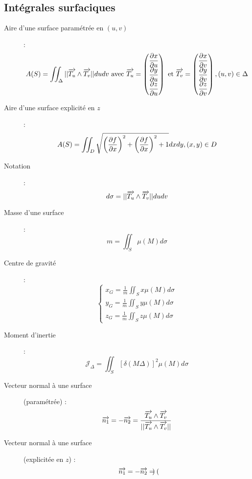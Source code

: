 \subsection{Intégrales surfaciques}
\begin{description}
\item[Aire d'une surface paramétrée en $(u,v)$] :
    \[
        A(S)=
        \iint_\Delta ||\overrightarrow{T_u}\land\overrightarrow{T_v}||dudv
        \textrm{ avec }
        \overrightarrow{T_u}=
        \begin{pmatrix}
            \dfrac{\partial x}{\partial u}\\
            \dfrac{\partial y}{\partial u}\\
            \dfrac{\partial z}{\partial u}
        \end{pmatrix}
        \textrm{ et }
        \overrightarrow{T_v}=
        \begin{pmatrix}
            \dfrac{\partial x}{\partial v}\\
            \dfrac{\partial y}{\partial v}\\
            \dfrac{\partial z}{\partial v}
        \end{pmatrix},
        (u,v)\in\Delta
    \]
\item[Aire d'une surface explicité en $z$] :
    \[
        A(S)=\iint_D\sqrt{
            \left(\dfrac{\partial f}{\partial x}\right)^2
            +\left(\dfrac{\partial f}{\partial x}\right)^2
            +1
        }dxdy, (x,y)\in D
    \]
\item[Notation] :
    \[
        d\sigma=||\overrightarrow{T_u}\land\overrightarrow{T_v}||dudv
    \]
\item[Masse d'une surface] :
    \[
        m=\iint_S\mu(M)d\sigma
    \]
\item[Centre de gravité] :
    \[
        \begin{cases}
            x_G=\frac{1}{m}\iint_Sx\mu(M)d\sigma\\
            y_G=\frac{1}{m}\iint_Sy\mu(M)d\sigma\\
            z_G=\frac{1}{m}\iint_Sz\mu(M)d\sigma
        \end{cases}
    \]
\item[Moment d'inertie] :
    \[
        \mathcal J_\Delta=\iint_S[\delta(M\Delta)]^2\mu(M)d\sigma
    \]
\item[Vecteur normal à une surface] (paramétrée) :
    \[
        \overrightarrow{n_1}=-\overrightarrow{n_2}=
        \frac{\overrightarrow{T_u}\land\overrightarrow{T_v}}{||\overrightarrow{T_u}\land\overrightarrow{T_v}||}
    \]
\item[Vecteur normal à une surface] (explicitée en $z$) :
    \[
        \overrightarrow{n_1}=-\overrightarrow{n_2}=
        \begin{pmatrix}

\end{pmatrix}\]
\end{description}
